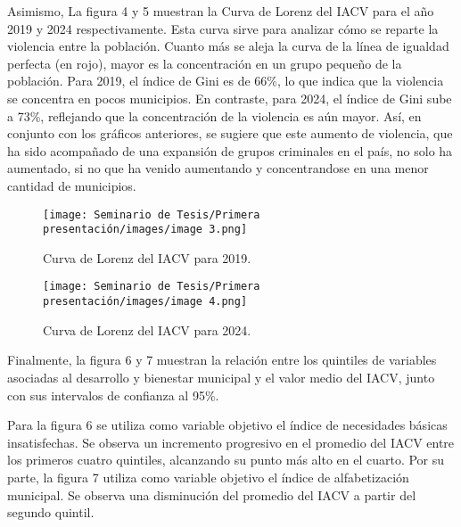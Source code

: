 Asimismo, La figura 4 y 5 muestran la Curva de Lorenz del IACV para el año 2019 y 2024 respectivamente. Esta curva sirve para analizar cómo se reparte la violencia entre la población. Cuanto más se aleja la curva de la línea de igualdad perfecta (en rojo), mayor es la concentración en un grupo pequeño de la población. Para 2019, el índice de Gini es de 66\%, lo que indica que la violencia se concentra en pocos municipios. En contraste, para 2024, el índice de Gini sube a 73\%, reflejando que la concentración de la violencia es aún mayor. Así, en conjunto con los gráficos anteriores, se sugiere que este aumento de violencia, que ha sido acompañado de una expansión de grupos criminales en el país, no solo ha aumentado, si no que ha venido aumentando y concentrandose en una menor cantidad de municipios. 

\newpage

\begin{figure}[h1]
    \centering
    \texttt{[image: Seminario de Tesis/Primera presentación/images/image 3.png]}
    \caption{Curva de Lorenz del IACV para 2019.}
    \label{fig:graph4}
\end{figure}


\begin{figure}[h!]
    \centering
    \texttt{[image: Seminario de Tesis/Primera presentación/images/image 4.png]}
    \caption{Curva de Lorenz del IACV para 2024.}
    \label{fig:graph5}
\end{figure}

\newpage

Finalmente, la figura 6 y 7 muestran la relación entre los quintiles de variables asociadas al desarrollo y bienestar municipal y el valor medio del IACV, junto con sus intervalos de confianza al 95\%. 

Para la figura 6 se utiliza como variable objetivo el índice de necesidades básicas insatisfechas. Se observa un incremento progresivo en el promedio del IACV entre los primeros cuatro quintiles, alcanzando su punto más alto en el cuarto. Por su parte, la figura 7 utiliza como variable objetivo el índice de alfabetización municipal. Se observa una disminución del promedio del IACV a partir del segundo quintil.

